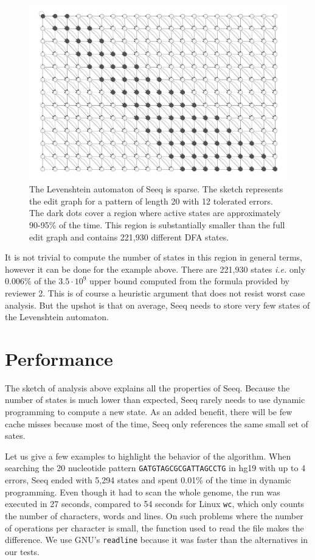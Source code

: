 \documentclass[12pt]{article}
\begin{document}
\begin{figure}[!tpb]
\centerline{\includegraphics[scale=0.24]{sparsity_of_the_DFA.pdf}}
\caption{The Levenshtein automaton of Seeq is sparse. The sketch
represents the edit graph for a pattern of length 20 with 12
tolerated errors. The dark dots cover a region where active
states are approximately 90-95\% of the time. This region is
substantially smaller than the full edit graph and contains
221,930 different DFA states.
}\label{sparsity}
\end{figure}

It is not trivial to compute the number of states in this region
in general terms, however it can be done for the example above.
There are 221,930 states \textit{i.e.} only $0.006\%$ of the
$3.5 \cdot 10^9$ upper bound computed from the formula provided by
reviewer 2. This is of course a heuristic argument that does not
resist worst case analysis. But the upshot is that on average,
Seeq needs to store very few states of the Levenshtein automaton.

\section{Performance}

The sketch of analysis above explains all the properties of Seeq.
Because the number of states is much lower than expected, Seeq
rarely needs to use dynamic programming to compute a new state.
As an added benefit, there will be few cache misses because
most of the time, Seeq only references the same small
set of sates.

Let us give a few examples to highlight the behavior of the
algorithm. When searching the 20 nucleotide pattern
\texttt{GATGTAGCGCGATTAGCCTG}
in hg19 with up to 4 errors, Seeq ended with 5,294 states and spent
0.01\% of the time in dynamic programming. Even though
it had to scan the whole genome, the run was executed in 27 seconds,
compared to 54 seconds for Linux \texttt{wc}, which only counts the
number of characters, words and lines. On such problems where the
number of operations per character is small, the function used to read
the file makes the difference. We use GNU's \texttt{readline} because
it was faster than the alternatives in our tests.
\end{document}

